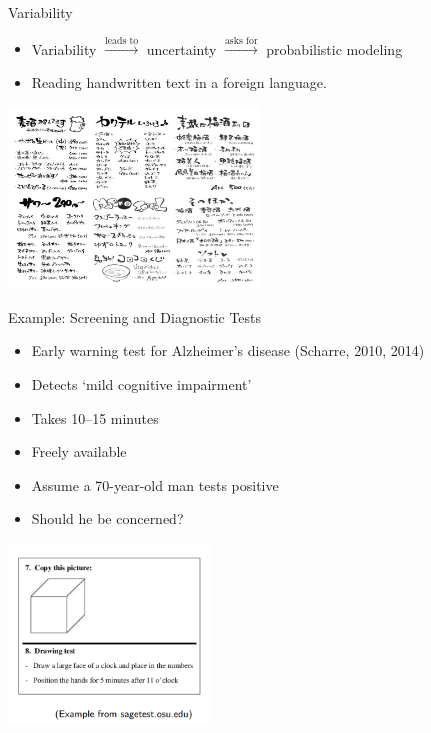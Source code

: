 \documentclass{beamer}
\begin{document}
\begin{frame}{Variability}
\begin{itemize}
\item Variability $\xrightarrow{\text{leads to}}$ uncertainty $\xrightarrow{\text{asks for}}$ probabilistic modeling
  \item Reading handwritten text in a foreign language.
\end{itemize}
\begin{center}
  \includegraphics[width=0.5\textwidth]{foreign_handwriting.png}
\end{center}
\end{frame}

\begin{frame}{Example: Screening and Diagnostic Tests}
\begin{itemize}
  \item Early warning test for Alzheimer’s disease (Scharre, 2010, 2014)
  \item Detects `mild cognitive impairment'
  \item Takes 10–15 minutes
  \item Freely available
  \item Assume a 70-year-old man tests positive
  \item Should he be concerned?
\end{itemize}
\begin{center}
  \includegraphics[width=0.4\textwidth]{sagetest_logo.png}
\end{center}
\end{frame}
\end{document}

